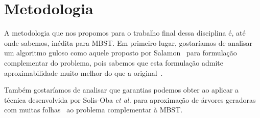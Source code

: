 \documentclass[conference]{IEEEtran}
\begin{document}
\section{Metodologia} \label{sec:methodology}

A metodologia que nos propomos para o trabalho final dessa disciplina é, até onde sabemos, inédita para MBST.
Em primeiro lugar, gostaríamos de analisar um algoritmo guloso como aquele proposto por Salamon~\cite{salamon2010} para formulação complementar do problema, pois sabemos que esta formulação admite aproximabilidade muito melhor do que a original~\cite{chimani2015}.

Também gostaríamos de analisar que garantias podemos obter ao aplicar a técnica desenvolvida por Solis-Oba \textit{et al.} para aproximação de árvores geradoras com muitas folhas~\cite{solis-oba2017} ao problema complementar à MBST.






\end{document}
